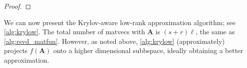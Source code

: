 \begin{proof}
\end{proof}

We can now present the Krylov-aware low-rank approximation algorithm; see \cref{alg:krylow}. The total number of matvecs with $\bm{A}$ is $(s+r)\ell$, the same as \cref{alg:rsvd_matfun}. 
However, as noted above, \cref{alg:krylow} (approximately) projects $f(\bm{A})$ onto a higher dimensional subbspace, ideally obtaining a better approximation.



